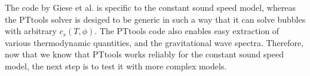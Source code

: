 The code by Giese et al. is specific to the constant sound speed model,
whereas the PTtools solver is desiged to be generic in such a way that
it can solve bubbles with arbitrary $c_s(T,\phi)$.
The PTtools code also enables easy extraction of various thermodynamic quantities,
and the gravitational wave spectra.
Therefore, now that we know that PTtools works reliably for the constant sound speed model,
the next step is to test it with more complex models.
